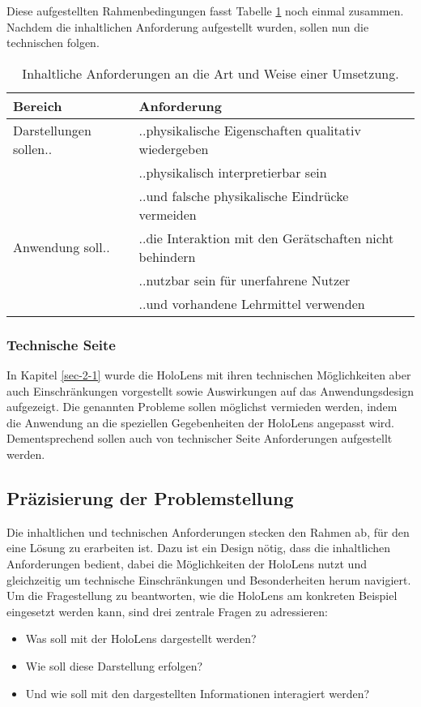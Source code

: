Diese aufgestellten Rahmenbedingungen fasst Tabelle \ref{tab:req} noch einmal zusammen. Nachdem die inhaltlichen Anforderung aufgestellt wurden, sollen nun die technischen folgen.

\bgroup
\setlength\extrarowheight{0pt}
\def\arraystretch{1.25}
\begin{table}[h!]
	\centering
	\begin{tabular}{l|l}
		Bereich & Anforderung\\
		\hline
		\hline
		Darstellungen sollen.. & ..physikalische Eigenschaften qualitativ wiedergeben\\
		 & ..physikalisch interpretierbar sein\\
		 & ..und falsche physikalische Eindrücke vermeiden\\
		 \hline
		Anwendung soll.. & ..die Interaktion mit den Gerätschaften nicht behindern\\
		 & ..nutzbar sein für unerfahrene Nutzer \\
		 & ..und vorhandene Lehrmittel verwenden
	\end{tabular}\caption{\label{tab:req} Inhaltliche Anforderungen an die Art und Weise einer Umsetzung.}
\end{table}
\egroup

\subsubsection{Technische Seite}
\label{sec-3-1-2}
In Kapitel \ref{sec-2-1} wurde die HoloLens mit ihren technischen Möglichkeiten aber auch Einschränkungen vorgestellt sowie Auswirkungen auf das Anwendungsdesign aufgezeigt. Die genannten Probleme sollen möglichst vermieden werden, indem die Anwendung an die speziellen Gegebenheiten der HoloLens angepasst wird. Dementsprechend sollen auch von technischer Seite Anforderungen aufgestellt werden.\\



\subsection{Präzisierung der Problemstellung}
\label{sec-3-2}
Die inhaltlichen und technischen Anforderungen stecken den Rahmen ab, für den eine Lösung zu erarbeiten ist. Dazu ist ein Design nötig, dass die inhaltlichen Anforderungen bedient, dabei die Möglichkeiten der HoloLens nutzt und gleichzeitig um technische Einschränkungen und Besonderheiten herum navigiert. Um die Fragestellung zu beantworten, wie die HoloLens am konkreten Beispiel eingesetzt werden kann, sind drei zentrale Fragen zu adressieren:
\begin{itemize}
	\setlength{\itemsep}{-5pt}
	\item Was soll mit der HoloLens dargestellt werden?
	\item Wie soll diese Darstellung erfolgen?
	\item Und wie soll mit den dargestellten Informationen interagiert werden?
\end{itemize}

